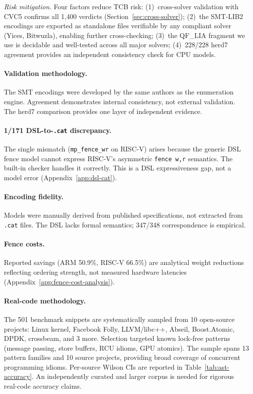 \documentclass[11pt]{article}
\begin{document}
\emph{Risk mitigation.}
Four factors reduce TCB risk:
(1)~cross-solver validation with CVC5 confirms all 1{,}400 verdicts
(Section~\ref{sec:cross-solver});
(2)~the SMT-LIB2 encodings are exported as standalone files verifiable
by any compliant solver (Yices, Bitwuzla), enabling further
cross-checking;
(3)~the QF\_LIA fragment we use is decidable and well-tested across
all major solvers;
(4)~228/228 herd7 agreement provides an independent consistency check
for CPU models.

\paragraph{Validation methodology.}
The SMT encodings were developed by the same authors as the
enumeration engine. Agreement demonstrates internal consistency,
not external validation. The herd7 comparison provides one layer
of independent evidence.

\paragraph{1/171 DSL-to-\texttt{.cat} discrepancy.}
The single mismatch (\texttt{mp\_fence\_wr} on RISC-V) arises
because the generic DSL fence model cannot express RISC-V's
asymmetric \texttt{fence w,r} semantics. The built-in checker
handles it correctly. This is a DSL expressiveness gap, not a
model error (Appendix~\ref{app:dsl-cat}).

\paragraph{Encoding fidelity.}
Models were manually derived from published specifications, not
extracted from \texttt{.cat} files. The DSL lacks formal semantics;
347/348 correspondence is empirical.

\paragraph{Fence costs.}
Reported savings (ARM 50.9\%, RISC-V 66.5\%) are analytical weight
reductions reflecting ordering strength, not measured hardware
latencies (Appendix~\ref{app:fence-cost-analysis}).

\paragraph{Real-code methodology.}
The 501 benchmark snippets are systematically sampled from 10
open-source projects: Linux kernel, Facebook Folly, LLVM/libc++,
Abseil, Boost.Atomic, DPDK, crossbeam, and 3 more.
Selection targeted known lock-free patterns (message passing,
store buffers, RCU idioms, GPU atomics).
The sample spans 13 pattern families and 10 source projects,
providing broad coverage of concurrent programming idioms.
Per-source Wilson CIs are reported in Table~\ref{tab:ast-accuracy}.
An independently curated and larger corpus is needed for rigorous
real-code accuracy claims.
\end{document}
